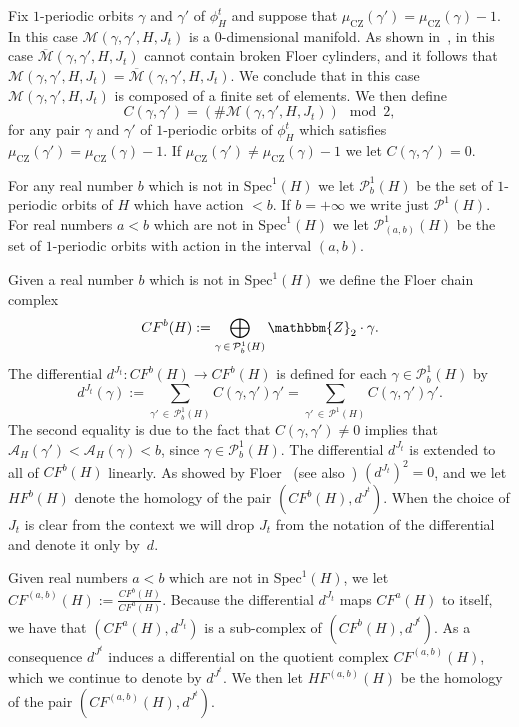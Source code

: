 \documentclass[AHL,Unicode,longabstracts,published]{cedram}
\newcommand{\Z}{\mathbbm{Z}}
\newcommand{\Spec}{\mathrm{Spec}}
\newcommand{\rCZ}{\mathrm{CZ}}
\newcommand{\clP}{\mathcal{P}}
\newcommand{\clA}{\mathcal{A}}
\newcommand{\clM}{\mathcal{M}}
\begin{document}
Fix $1$-periodic orbits $\gamma$ and $\gamma'$ of $\phi^t_H$ and suppose that $\mu_{\rCZ}(\gamma') = \mu_{\rCZ}(\gamma) - 1$. In this case $\clM(\gamma, \gamma', {H},J_t)$ is a $0$-dimensional manifold. As shown in~\cite{AD,Floer}, in this case $\overline{\clM}(\gamma, \gamma', {H},J_t)$ cannot contain broken Floer cylinders, and it follows that $\clM(\gamma, \gamma', {H},J_t)= \overline{\clM}(\gamma, \gamma', {H},J_t)$. We conclude that in this case $\clM(\gamma, \gamma', {H},J_t)$ is composed of a finite set of elements. We then define
\[
C(\gamma,\gamma')= \left(\# \clM(\gamma, \gamma', {H},J_t)\right) \mod 2,
\]
for any pair $\gamma$ and $\gamma'$ of $1$-periodic orbits of $\phi^t_H$ which satisfies $\mu_{\rCZ}(\gamma') = \mu_{\rCZ}(\gamma) - 1$. If $\mu_{\rCZ}(\gamma') \neq \mu_{\rCZ}(\gamma) - 1$ we let $C(\gamma,\gamma')=0$.

For any real number $b$ which is not in $\Spec^1(H)$ we let $\clP^1_{b}(H)$ be the set of $1$-periodic orbits of $H$ which have action $<b$. If $b=+\infty$ we write just $\clP^1(H)$. For real numbers $a<b$ which are not in $\Spec^1(H)$ we let $\clP^1_{(a,b)}(H)$ be the set of $1$-periodic orbits with action in the interval $(a,b)$.

Given a real number $b$ which is not in $\Spec^1(H)$ we define the Floer chain complex
\[
CF^b(H) := \bigoplus_{\gamma\,\in\,\clP^1_{b}(H)} \Z_2 \cdot \gamma.
\]
The differential $d^{J_t}: CF^b(H) \to CF^b(H)$ is defined for each $\gamma \in \clP^1_{b}(H)$ by
\begin{equation*}
d^{J_t} (\gamma) := \sum_{\gamma'\,\in\,\clP^1_{b}(H) } C(\gamma,\gamma')\gamma' = \sum_{\gamma'\,\in\,\clP^1(H)} C(\gamma,\gamma')\gamma'.
\end{equation*}
The second equality is due to the fact that $C(\gamma,\gamma')\neq 0$ implies that \linebreak $\clA_H(\gamma') < \clA_H(\gamma) < b $, since $\gamma \in \clP^1_{b}(H)$. The differential $d^{J_t}$ is extended to all of $CF^{b}(H)$ linearly. As showed by Floer~\cite{Floer} (see also~\cite{AD}) $(d^{J_t})^2=0$, and we let $HF^{b}(H)$ denote the homology of the pair $(CF^{b}(H),d^{J^t})$. When the choice of $J_t$ is clear from the context we will drop $J_t$ from the notation of the differential and denote it only by~$d$.

Given real numbers $a<b$ which are not in $\Spec^1(H)$, we let $CF^{(a,b)}(H):= \frac{CF^b(H)}{{CF^a(H)}} $. Because the differential $d^{J_t}$ maps $CF^a(H)$ to itself, we have that $(CF^a(H),d^{J_t})$ is a sub-complex of $(CF^{b}(H),d^{J^t})$. As a consequence $d^{J^t}$ induces a differential on the quotient complex $CF^{(a,b)}(H)$, which we continue to denote by $d^{J^t}$. We then let $HF^{(a,b)}(H)$ be the homology of the pair $(CF^{(a,b)}(H),d^{J^t})$.
\end{document}
